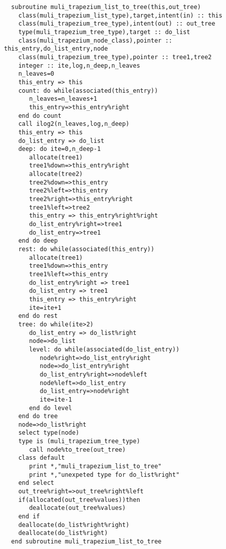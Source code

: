 \begin{Verbatim}
  subroutine muli_trapezium_list_to_tree(this,out_tree)
    class(muli_trapezium_list_type),target,intent(in) :: this
    class(muli_trapezium_tree_type),intent(out) :: out_tree
    type(muli_trapezium_tree_type),target :: do_list
    class(muli_trapezium_node_class),pointer :: this_entry,do_list_entry,node
    class(muli_trapezium_tree_type),pointer :: tree1,tree2
    integer :: ite,log,n_deep,n_leaves
    n_leaves=0
    this_entry => this
    count: do while(associated(this_entry))
       n_leaves=n_leaves+1
       this_entry=>this_entry%right
    end do count
    call ilog2(n_leaves,log,n_deep)
    this_entry => this
    do_list_entry => do_list
    deep: do ite=0,n_deep-1
       allocate(tree1)
       tree1%down=>this_entry%right
       allocate(tree2)
       tree2%down=>this_entry
       tree2%left=>this_entry
       tree2%right=>this_entry%right
       tree1%left=>tree2
       this_entry => this_entry%right%right
       do_list_entry%right=>tree1
       do_list_entry=>tree1
    end do deep
    rest: do while(associated(this_entry))
       allocate(tree1)
       tree1%down=>this_entry
       tree1%left=>this_entry
       do_list_entry%right => tree1
       do_list_entry => tree1
       this_entry => this_entry%right
       ite=ite+1
    end do rest
    tree: do while(ite>2)
       do_list_entry => do_list%right
       node=>do_list
       level: do while(associated(do_list_entry))
          node%right=>do_list_entry%right
          node=>do_list_entry%right
          do_list_entry%right=>node%left
          node%left=>do_list_entry
          do_list_entry=>node%right
          ite=ite-1
       end do level
    end do tree
    node=>do_list%right
    select type(node)
    type is (muli_trapezium_tree_type)
       call node%to_tree(out_tree)
    class default
       print *,"muli_trapezium_list_to_tree"
       print *,"unexpeted type for do_list%right"
    end select
    out_tree%right=>out_tree%right%left
    if(allocated(out_tree%values))then
       deallocate(out_tree%values)
    end if
    deallocate(do_list%right%right)
    deallocate(do_list%right)
  end subroutine muli_trapezium_list_to_tree
\end{Verbatim}

